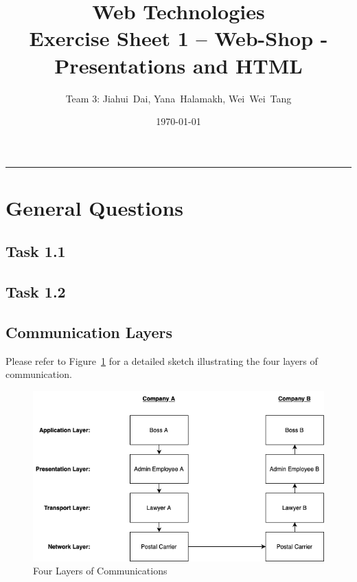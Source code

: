 \documentclass[a4paper,12pt]{article} %
\title{Web Technologies \\
        \large{Exercise Sheet 1 -- Web-Shop - Presentations and HTML}} %
\author{Team 3: Jiahui~Dai, Yana~Halamakh, Wei~Wei~Tang} %
\date{\today} %
\begin{document}
\maketitle %
\hrule %
\tableofcontents %
\newpage



\section{General Questions}

\subsection{Task 1.1}

\subsection{Task 1.2}


\subsection{Communication Layers}
Please refer to Figure~\ref{fig:task1-3} for a detailed sketch illustrating the four layers of communication.

\begin{figure}[h]
    \centering
    \includegraphics[width=.8\textwidth]{communication-layers.drawio.png} %
    \caption{Four Layers of Communications}
    \label{fig:task1-3}
\end{figure}



\end{document}
